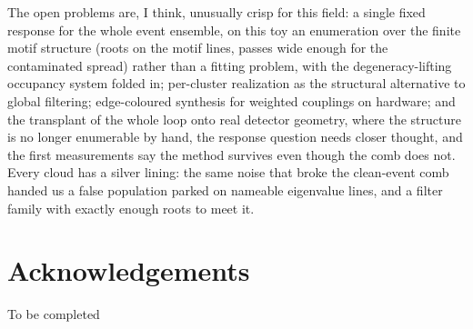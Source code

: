\documentclass[11pt,a4paper]{article}
\begin{document}
The open problems are, I think, unusually crisp for this field: a
single fixed response for the whole event ensemble, on this toy
an enumeration over the finite motif structure (roots on the motif
lines, passes wide enough for the contaminated spread) rather than
a fitting problem, with the degeneracy-lifting occupancy system folded
in; per-cluster realization as the structural
alternative to global filtering; edge-coloured synthesis for
weighted couplings on hardware; and the transplant of the whole
loop onto real detector geometry, where the structure is no longer
enumerable by hand, the response question needs closer thought, and
the first measurements say the method survives even though the comb
does not. Every cloud has
a silver lining: the same noise that broke the clean-event comb
handed us a false population parked on nameable eigenvalue lines,
and a filter family with exactly enough roots to meet it.

\section*{Acknowledgements}
To be completed 
\end{document}
